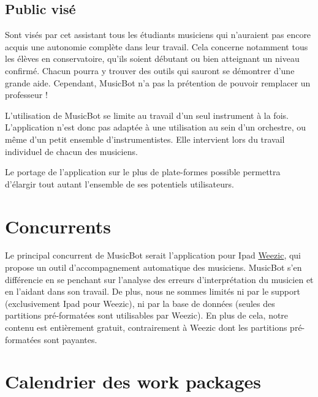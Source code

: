 \documentclass{article}
\begin{document}
\subsection{Public visé}
Sont visés par cet assistant tous les étudiants musiciens qui n'auraient pas encore acquis une autonomie complète dans leur travail. Cela concerne notamment tous les élèves en conservatoire, qu'ils soient débutant ou bien atteignant un niveau confirmé. Chacun pourra y trouver des outils qui sauront se démontrer d'une grande aide. Cependant, MusicBot n'a pas la prétention de pouvoir remplacer un professeur !

L'utilisation de MusicBot se limite au travail d'un seul instrument à la fois. L'application n'est donc pas adaptée à une utilisation au sein d'un orchestre, ou même d'un petit ensemble d'instrumentistes. Elle intervient lors du travail individuel de chacun des musiciens.

Le portage de l'application sur le plus de plate-formes possible permettra d'élargir tout autant l'ensemble de ses potentiels utilisateurs.

\section{Concurrents}
Le principal concurrent de MusicBot serait l'application pour Ipad \href{http://weezic.com/fr/}{Weezic}, qui propose un outil d'accompagnement automatique des musiciens.
MusicBot s'en différencie en se penchant sur l'analyse des erreurs d'interprétation du musicien et en l'aidant dans son travail. De plus, nous ne sommes limités ni par le support (exclusivement Ipad pour Weezic), ni par la base de données (seules des partitions pré-formatées sont utilisables par Weezic). En plus de cela, notre contenu est entièrement gratuit, contrairement à Weezic dont les partitions pré-formatées sont payantes.


\section{Calendrier des work packages}
\end{document}
